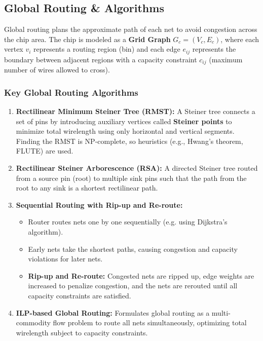 \documentclass[12pt,a4paper]{article}
\begin{document}
\subsection{Global Routing \& Algorithms}
Global routing plans the approximate path of each net to avoid congestion across the chip area. The chip is modeled as a \textbf{Grid Graph} $G_c = (V_c, E_c)$, where each vertex $v_i$ represents a routing region (bin) and each edge $e_{ij}$ represents the boundary between adjacent regions with a capacity constraint $c_{ij}$ (maximum number of wires allowed to cross).

\subsubsection{Key Global Routing Algorithms}
\begin{enumerate}[leftmargin=*, itemsep=4pt]
  \item \textbf{Rectilinear Minimum Steiner Tree (RMST):} A Steiner tree connects a set of pins by introducing auxiliary vertices called \textbf{Steiner points} to minimize total wirelength using only horizontal and vertical segments. Finding the RMST is NP-complete, so heuristics (e.g., Hwang's theorem, FLUTE) are used.
  \item \textbf{Rectilinear Steiner Arborescence (RSA):} A directed Steiner tree routed from a source pin (root) to multiple sink pins such that the path from the root to any sink is a shortest rectilinear path.
  \item \textbf{Sequential Routing with Rip-up and Re-route:}
        \begin{itemize}[leftmargin=*, label=$\bullet$, itemsep=1pt]
          \item Router routes nets one by one sequentially (e.g. using Dijkstra's algorithm).
          \item Early nets take the shortest paths, causing congestion and capacity violations for later nets.
          \item \textbf{Rip-up and Re-route:} Congested nets are ripped up, edge weights are increased to penalize congestion, and the nets are rerouted until all capacity constraints are satisfied.
        \end{itemize}
  \item \textbf{ILP-based Global Routing:} Formulates global routing as a multi-commodity flow problem to route all nets simultaneously, optimizing total wirelength subject to capacity constraints.
\end{enumerate}
\end{document}
